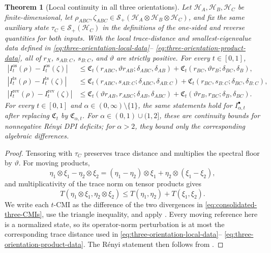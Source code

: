\documentclass[11pt]{article}
\newtheorem{theorem}[theorem]{Theorem}
\theoremstyle{remark}
\DeclareMathOperator{\os}{os}
\DeclareMathOperator{\ts}{ts}
\DeclareMathOperator{\rev}{rev}
\newcommand{\1}{\mathbbm{1}}
\begin{document}
\begin{theorem}[Local continuity in all three orientations]
\label{theo:three-orientation-local-continuity}
Let $\mathcal H_A,\mathcal H_B,\mathcal H_C$ be finite-dimensional,
let $\rho_{ABC},\zeta_{ABC}\in
\mathcal S_+(\mathcal H_A\otimes\mathcal H_B\otimes\mathcal H_C)$,
and fix the same auxiliary state
$\tau_C\in\mathcal S_+(\mathcal H_C)$ in the definitions of the
one-sided and reverse quantities for both inputs.  With the local
trace-distance and smallest-eigenvalue data defined in
\eqref{eq:three-orientation-local-data}--%
\eqref{eq:three-orientation-product-data}, all of
$r_X$, $s_{AB:C}$, $s_{B:C}$, and $\vartheta$ are strictly positive.
For every $t\in[0,1]$,
\begin{align}
 |I_t^{\os}(\rho)-I_t^{\os}(\zeta)|
 &\leq
 \mathfrak C_t(r_{ABC},\vartheta r_{AB};
                  \delta_{ABC},\delta_{AB})
 +\mathfrak C_t(r_{BC},\vartheta r_B;
                  \delta_{BC},\delta_B),
 \label{eq:three-orientation-os-local}\\
 |I_t^{\ts}(\rho)-I_t^{\ts}(\zeta)|
 &\leq
 \mathfrak C_t(r_{ABC},s_{AB:C};
                  \delta_{ABC},\delta_{AB:C})
 +\mathfrak C_t(r_{BC},s_{B:C};
                  \delta_{BC},\delta_{B:C}),
 \label{eq:three-orientation-ts-local}\\
 |I_t^{\rev}(\rho)-I_t^{\rev}(\zeta)|
 &\leq
 \mathfrak C_t(\vartheta r_{AB},r_{ABC};
                  \delta_{AB},\delta_{ABC})
 +\mathfrak C_t(\vartheta r_B,r_{BC};
                  \delta_B,\delta_{BC}).
 \label{eq:three-orientation-rev-local}
\end{align}
For every $t\in[0,1]$ and
$\alpha\in(0,\infty)\setminus\{1\}$, the same statements hold for
$I_{\alpha,t}^\bullet$ after replacing $\mathfrak C_t$ by
$\mathfrak C_{\alpha,t}$.  For
$\alpha\in(0,1)\cup(1,2]$, these are continuity bounds for
nonnegative R\'enyi DPI deficits; for $\alpha>2$, they bound only the
corresponding algebraic differences.
\end{theorem}

\begin{proof}
Tensoring with $\tau_C$ preserves trace distance and multiplies the
spectral floor by $\vartheta$.  For moving products,
\begin{equation}
 \eta_1\otimes\xi_1-\eta_2\otimes\xi_2
 = (\eta_1-\eta_2)\otimes\xi_1
   +\eta_2\otimes(\xi_1-\xi_2),
\end{equation}
and multiplicativity of the trace norm on tensor products
\cite[Section~1.1]{watrous2018theory} gives
\begin{equation}
 T(\eta_1\otimes\xi_1,\eta_2\otimes\xi_2)
 \leq T(\eta_1,\eta_2)+T(\xi_1,\xi_2).
\end{equation}
We write each $t$-CMI as the difference of the two divergences in
\eqref{eq:consolidated-three-CMIs}, use the triangle inequality, and
apply .  Every moving reference
here is a normalized state, so its operator-norm perturbation is at
most the corresponding trace distance used in
\eqref{eq:three-orientation-local-data}--%
\eqref{eq:three-orientation-product-data}.  The R\'enyi statement
then follows from .
\end{proof}
\end{document}
